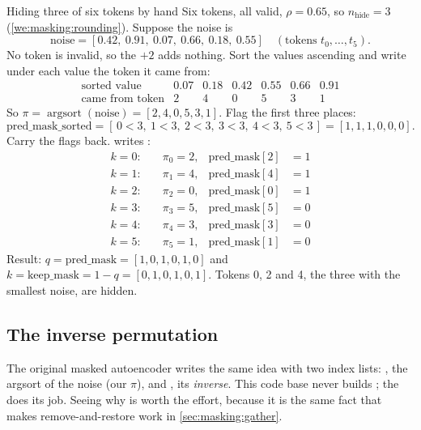 \begin{worked}[label={we:masking:perm}]{Hiding three of six tokens by hand}
Six tokens, all valid, $\rho = 0.65$, so $n_{\text{hide}} = 3$ (\cref{we:masking:rounding}). Suppose
the noise is
\[
\text{noise} = [0.42,\ 0.91,\ 0.07,\ 0.66,\ 0.18,\ 0.55] \quad (\text{tokens } t_0, \dots, t_5) .
\]
No token is invalid, so the $+2$ adds nothing. Sort the values ascending and write under each value the
token it came from:
\[
\begin{array}{l|cccccc}
\text{sorted value} & 0.07 & 0.18 & 0.42 & 0.55 & 0.66 & 0.91\\
\text{came from token} & 2 & 4 & 0 & 5 & 3 & 1
\end{array}
\]
So $\pi = \operatorname{argsort}(\text{noise}) = [2, 4, 0, 5, 3, 1]$. Flag the first three places:
\[
\text{pred\_mask\_sorted} = [\,0 < 3,\ 1 < 3,\ 2 < 3,\ 3 < 3,\ 4 < 3,\ 5 < 3\,] = [1, 1, 1, 0, 0, 0] .
\]
Carry the flags back.  writes :
\begin{align*}
k = 0:&\quad \pi_0 = 2, & \text{pred\_mask}[2] &= 1\\
k = 1:&\quad \pi_1 = 4, & \text{pred\_mask}[4] &= 1\\
k = 2:&\quad \pi_2 = 0, & \text{pred\_mask}[0] &= 1\\
k = 3:&\quad \pi_3 = 5, & \text{pred\_mask}[5] &= 0\\
k = 4:&\quad \pi_4 = 3, & \text{pred\_mask}[3] &= 0\\
k = 5:&\quad \pi_5 = 1, & \text{pred\_mask}[1] &= 0
\end{align*}
Result: $q = \text{pred\_mask} = [1, 0, 1, 0, 1, 0]$ and $k = \text{keep\_mask} = 1 - q = [0, 1, 0, 1, 0, 1]$.
Tokens 0, 2 and 4, the three with the smallest noise, are hidden.
\end{worked}

\subsection{The inverse permutation}

The original masked autoencoder \citep{he2022masked} writes the same idea with two index lists:
, the argsort of the noise (our $\pi$), and , its
\emph{inverse}. This code base never builds ; the
 does its job. Seeing why is worth the effort, because it is the same fact that makes
remove-and-restore work in \cref{sec:masking:gather}.

